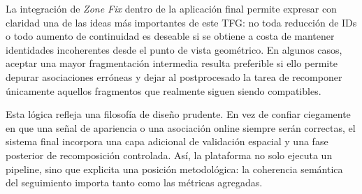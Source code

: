 \documentclass[../MAIN.tex]{subfiles}
\begin{document}
	La integración de \textit{Zone Fix} dentro de la aplicación final permite expresar con claridad una de las ideas más importantes de este TFG: no toda reducción de IDs o todo aumento de continuidad es deseable si se obtiene a costa de mantener identidades incoherentes desde el punto de vista geométrico. En algunos casos, aceptar una mayor fragmentación intermedia resulta preferible si ello permite depurar asociaciones erróneas y dejar al postprocesado la tarea de recomponer únicamente aquellos fragmentos que realmente siguen siendo compatibles.
	
	Esta lógica refleja una filosofía de diseño prudente. En vez de confiar ciegamente en que una señal de apariencia o una asociación online siempre serán correctas, el sistema final incorpora una capa adicional de validación espacial y una fase posterior de recomposición controlada. Así, la plataforma no solo ejecuta un pipeline, sino que explicita una posición metodológica: la coherencia semántica del seguimiento importa tanto como las métricas agregadas.
	
	\newpage
	
\end{document}
